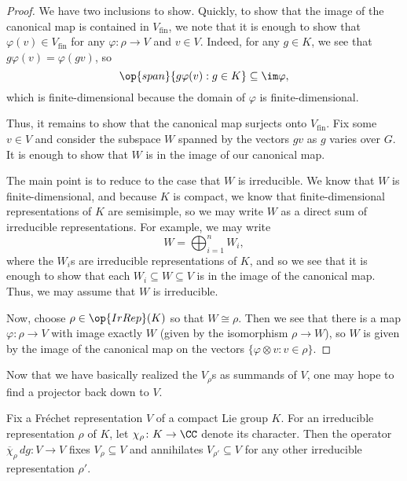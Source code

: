 \documentclass[../notes.tex]{subfiles}
\begin{document}
\begin{proof}
	We have two inclusions to show. Quickly, to show that the image of the canonical map is contained in $V_{\mathrm{fin}}$, we note that it is enough to show that $\varphi(v)\in V_{\mathrm{fin}}$ for any $\varphi\colon\rho\to V$ and $v\in V$. Indeed, for any $g\in K$, we see that $g\varphi(v)=\varphi(gv)$, so
	\[\op{span}\{g\varphi(v):g\in K\}\subseteq\im\varphi,\]
	which is finite-dimensional because the domain of $\varphi$ is finite-dimensional.

	Thus, it remains to show that the canonical map surjects onto $V_{\mathrm{fin}}$. Fix some $v\in V$ and consider the subspace $W$ spanned by the vectors $gv$ as $g$ varies over $G$. It is enough to show that $W$ is in the image of our canonical map.
	
	The main point is to reduce to the case that $W$ is irreducible. We know that $W$ is finite-dimensional, and because $K$ is compact, we know that finite-dimensional representations of $K$ are semisimple, so we may write $W$ as a direct sum of irreducible representations. For example, we may write
	\[W=\bigoplus_{i=1}^nW_i,\]
	where the $W_i$s are irreducible representations of $K$, and so we see that it is enough to show that each $W_i\subseteq W\subseteq V$ is in the image of the canonical map. Thus, we may assume that $W$ is irreducible.

	Now, choose $\rho\in\op{IrRep}(K)$ so that $W\cong\rho$. Then we see that there is a map $\varphi\colon\rho\to V$ with image exactly $W$ (given by the isomorphism $\rho\to W$), so $W$ is given by the image of the canonical map on the vectors $\{\varphi\otimes v:v\in\rho\}$.
\end{proof}
Now that we have basically realized the $V_\rho$s as summands of $V$, one may hope to find a projector back down to $V$.
\begin{lemma}
	Fix a Fr\'echet representation $V$ of a compact Lie group $K$. For an irreducible representation $\rho$ of $K$, let $\chi_\rho\colon K\to\CC$ denote its character. Then the operator $\overline\chi_\rho\,dg\colon V\to V$ fixes $V_\rho\subseteq V$ and annihilates $V_{\rho'}\subseteq V$ for any other irreducible representation $\rho'$.
\end{lemma}
\end{document}
